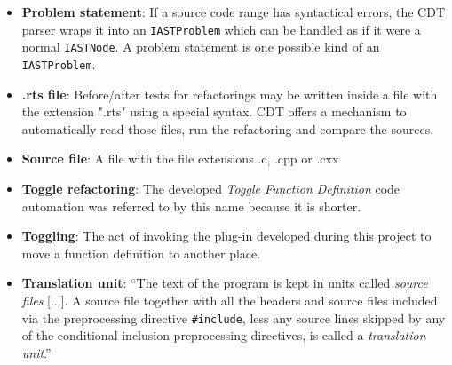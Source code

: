 \begin{itemize}
\item \textbf{Problem statement}: If a source code range has syntactical errors, 
the CDT parser wraps it into an \texttt{IASTProblem} which can be handled as if 
it were a normal \texttt{IASTNode}. A problem statement is one possible kind of 
an \texttt{IASTProblem}.

\item \textbf{.rts file}: Before/after tests for refactorings may be written 
inside a file with the extension ".rts" using a special syntax. CDT offers a 
mechanism to automatically read those files, run the refactoring and compare the 
sources.

\item \textbf{Source file}: A file with the file extensions .c, .cpp or .cxx

\item \textbf{Toggle refactoring}: The developed \textit{Toggle Function 
Definition} code automation was referred to by this name because it is shorter.

\item \textbf{Toggling}: The act of invoking the plug-in developed during this 
project to move a function definition to another place.

\item \textbf{Translation unit}: ``The text of the program is kept in units 
called \textit{source files} [...]. A source file together with all the headers and 
source files included via the preprocessing directive \texttt{\#include}, less 
any source lines skipped by any of the conditional inclusion preprocessing 
directives, is called a \textit{translation unit}.''\cite{IsoCpp}
\end{itemize}

